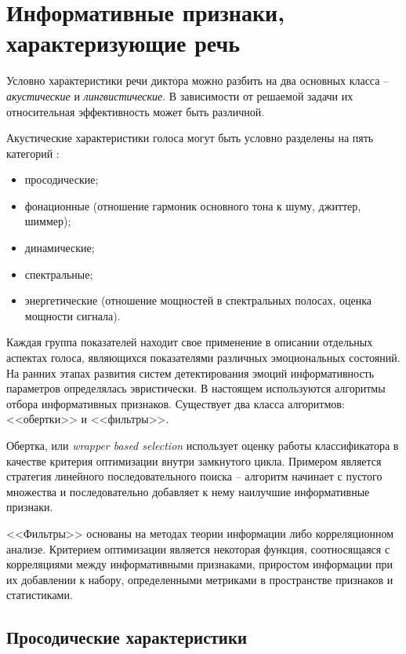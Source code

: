 \chapter[Информативные признаки, характеризующие речь]{Информативные признаки, характеризующие речь}
Условно характеристики речи диктора можно разбить на два основных
класса -- \textit{акустические} и \textit{лингвистические}. В зависимости от решаемой задачи
их относительная эффективность может быть различной. \cite{speech-patterns}

 Акустические характеристики голоса могут быть условно разделены на пять категорий \cite{categories}:
\begin{itemize}
	\item просодические;
	\item фонационные (отношение гармоник основного тона к шуму, джиттер, шиммер);
	\item динамические;
	\item спектральные;
	\item энергетические (отношение мощностей в спектральных полосах, оценка мощности сигнала).
\end{itemize}

\noindent Каждая группа показателей находит свое применение в описании отдельных аспектах голоса, являющихся показателями различных эмоциональных состояний. На ранних этапах развития систем детектирования эмоций информативность параметров определялась эвристически. В настоящем используются алгоритмы отбора информативных признаков. Существует два класса алгоритмов: <<обертки>> и  <<фильтры>>.

Обертка, или \textit{wrapper based selection} использует оценку работы классификатора в качестве критерия оптимизации внутри замкнутого цикла. Примером является стратегия линейного последовательного поиска -- алгоритм начинает с пустого множества и последовательно
добавляет к нему наилучшие информативные признаки. \cite{wrapper}

<<Фильтры>> основаны на методах теории информации либо корреляционном анализе. Критерием оптимизации является некоторая функция, соотносящаяся с корреляциями между информативными признаками, приростом информации при их  добавлении к набору, определенными метриками в пространстве признаков и статистиками. \cite{filter}

\section{Просодические характеристики}

